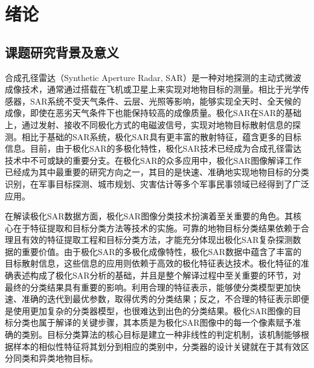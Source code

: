 \chapter{绪\hspace{6pt}论}

\section{课题研究背景及意义}
合成孔径雷达（Synthetic Aperture Radar, SAR）是一种对地探测的主动式微波成像技术，通常通过搭载在飞机或卫星上来实现对地物目标的测量。相比于光学传感器，SAR系统不受天气条件、云层、光照等影响，能够实现全天时、全天候的成像，即使在恶劣天气条件下也能保持较高的成像质量。极化SAR在SAR的基础上，通过发射、接收不同极化方式的电磁波信号，实现对地物目标散射信息的探测。相比于基础的SAR系统，极化SAR具有更丰富的散射特征，蕴含更多的目标信息。目前，由于极化SAR的多极化特性，极化SAR技术已经成为合成孔径雷达技术中不可或缺的重要分支。在极化SAR的众多应用中，极化SAR图像解译工作已经成为其中最重要的研究方向之一，其目的是快速、准确地实现地物目标的分类识别，在军事目标探测、城市规划、灾害估计等多个军事民事领域已经得到了广泛应用。

在解读极化SAR数据方面，极化SAR图像分类技术扮演着至关重要的角色。其核心在于特征提取和目标分类方法等技术的实施。可靠的地物目标分类结果依赖于合理且有效的特征提取工程和目标分类方法，才能充分体现出极化SAR复杂探测数据的重要价值。由于极化SAR的多极化成像特性，极化SAR数据中蕴含了丰富的目标散射信息，这些信息的应用则依赖于高效的极化特征表达技术。极化特征的准确表述构成了极化SAR分析的基础，并且是整个解译过程中至关重要的环节，对最终的分类结果具有重要的影响。利用合理的特征表示，能够使分类模型更加快速、准确的迭代到最优参数，取得优秀的分类结果；反之，不合理的特征表示即便是使用更加复杂的分类器模型，也很难达到出色的分类结果。极化SAR图像的目标分类也属于解译的关键步骤，其本质是为极化SAR图像中的每一个像素赋予准确的类别。目标分类算法的核心目标是建立一种非线性的判定机制，该机制能够根据样本的相似性特征将其划分到相应的类别中，分类器的设计关键就在于其有效区分同类和异类地物目标。



